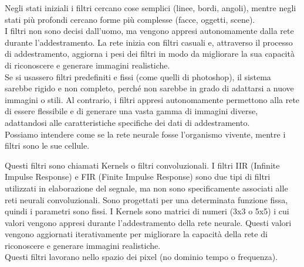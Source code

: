 Negli stati iniziali i filtri cercano cose semplici (linee, bordi, angoli), mentre negli stati più profondi cercano forme più complesse (facce, oggetti, scene).\\

I filtri non sono decisi dall'uomo, ma vengono appresi autonomamente dalla rete durante l'addestramento. La rete inizia con filtri casuali e, attraverso il processo di addestramento, aggiorna i pesi dei filtri in modo da migliorare la sua capacità di riconoscere e generare immagini realistiche.\\

Se si usassero filtri predefiniti e fissi (come quelli di photoshop), il sistema sarebbe rigido e non completo, perché non sarebbe in grado di adattarsi a nuove immagini o stili. Al contrario, i filtri appresi autonomamente permettono alla rete di essere flessibile e di generare una vasta gamma di immagini diverse, adattandosi alle caratteristiche specifiche dei dati di addestramento.\\

Possiamo intendere come se la rete neurale fosse l'organismo vivente, mentre i filtri sono le sue cellule.

Questi filtri sono chiamati Kernels o filtri convoluzionali. I filtri IIR (Infinite Impulse Response) e FIR (Finite Impulse Response) sono due tipi di filtri utilizzati in elaborazione del segnale, ma non sono specificamente associati alle reti neurali convoluzionali. Sono progettati per una determinata funzione fissa, quindi i parametri sono fissi.
I Kernels sono matrici di numeri (3x3 o 5x5) i cui valori vengono appresi durante l'addestramento della rete neurale. Questi valori vengono aggiornati iterativamente per migliorare la capacità della rete di riconoscere e generare immagini realistiche.\\

Questi filtri lavorano nello spazio dei pixel (no dominio tempo o frequenza).\\

